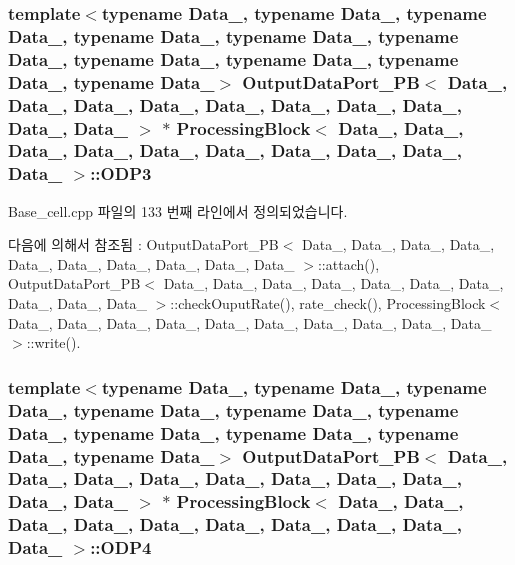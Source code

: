 \subsubsection[{\texorpdfstring{O\+D\+P3}{ODP3}}]{\setlength{\rightskip}{0pt plus 5cm}template$<$typename Data\+\_, typename Data\+\_, typename Data\+\_, typename Data\+\_, typename Data\+\_, typename Data\+\_, typename Data\+\_, typename Data\+\_, typename Data\+\_, typename Data\+\_$>$ {\bf Output\+Data\+Port\+\_\+\+PB}$<$ Data\+\_, Data\+\_, Data\+\_, Data\+\_, Data\+\_, Data\+\_, Data\+\_, Data\+\_, Data\+\_, Data\+\_ $>$ $\ast$ {\bf Processing\+Block}$<$ Data\+\_, Data\+\_, Data\+\_, Data\+\_, Data\+\_, Data\+\_, Data\+\_, Data\+\_, Data\+\_, Data\+\_ $>$\+::O\+D\+P3}\hypertarget{classProcessingBlock_a4fa4bd960336e16b020bed41376c6fe5}{}\label{classProcessingBlock_a4fa4bd960336e16b020bed41376c6fe5}


Base\+\_\+cell.\+cpp 파일의 133 번째 라인에서 정의되었습니다.



다음에 의해서 참조됨 \+:  Output\+Data\+Port\+\_\+\+P\+B$<$ Data\+\_, Data\+\_, Data\+\_, Data\+\_, Data\+\_, Data\+\_, Data\+\_, Data\+\_, Data\+\_, Data\+\_ $>$\+::attach(), Output\+Data\+Port\+\_\+\+P\+B$<$ Data\+\_, Data\+\_, Data\+\_, Data\+\_, Data\+\_, Data\+\_, Data\+\_, Data\+\_, Data\+\_, Data\+\_ $>$\+::check\+Ouput\+Rate(), rate\+\_\+check(), Processing\+Block$<$ Data\+\_, Data\+\_, Data\+\_, Data\+\_, Data\+\_, Data\+\_, Data\+\_, Data\+\_, Data\+\_, Data\+\_ $>$\+::write().

\subsubsection[{\texorpdfstring{O\+D\+P4}{ODP4}}]{\setlength{\rightskip}{0pt plus 5cm}template$<$typename Data\+\_, typename Data\+\_, typename Data\+\_, typename Data\+\_, typename Data\+\_, typename Data\+\_, typename Data\+\_, typename Data\+\_, typename Data\+\_, typename Data\+\_$>$ {\bf Output\+Data\+Port\+\_\+\+PB}$<$ Data\+\_, Data\+\_, Data\+\_, Data\+\_, Data\+\_, Data\+\_, Data\+\_, Data\+\_, Data\+\_, Data\+\_ $>$ $\ast$ {\bf Processing\+Block}$<$ Data\+\_, Data\+\_, Data\+\_, Data\+\_, Data\+\_, Data\+\_, Data\+\_, Data\+\_, Data\+\_, Data\+\_ $>$\+::O\+D\+P4}\hypertarget{classProcessingBlock_a144a5c91e1033f542205597f6633856b}{}\label{classProcessingBlock_a144a5c91e1033f542205597f6633856b}


